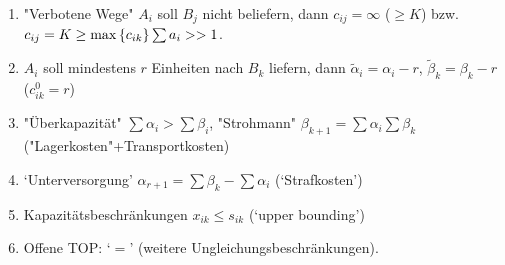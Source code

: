         \begin{remark}[Modifikationen]
            \begin{enumerate}
                    \item "Verbotene Wege" $A_i$ soll $B_j$ nicht beliefern, dann $c_{ij}=\infty$ ($\geq K$) bzw. $c_{ij}=K\geq \max\set{c_{ik}}\sum{a_i}>>1$.
                    \item $A_i$ soll mindestens $r$ Einheiten nach $B_k$ liefern, dann $\tilde \alpha_i = \alpha_i-r$, $\tilde \beta_k = \beta_k-r$ ($c_{ik}^0=r$)
                    \item "Überkapazität" $\sum\alpha_i>\sum\beta_i$, "Strohmann" $\beta_{k+1}=\sum\alpha_i\sum\beta_k$ ("Lagerkosten"+Transportkosten)
                    \item `Unterversorgung' $\alpha_{r+1}=\sum\beta_k-\sum\alpha_i$ (`Strafkosten')
                    \item Kapazitätsbeschränkungen $x_{ik}\leq s_{ik}$ (`upper bounding')
                \item Offene TOP: `$=$' (weitere Ungleichungsbeschränkungen).
            \end{enumerate}
        \end{remark}

        